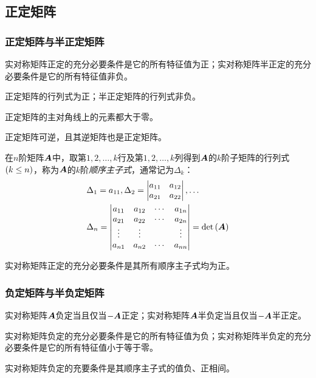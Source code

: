 \documentclass{ctexart}
\begin{document}
\subsection{正定矩阵}

\subsubsection*{正定矩阵与半正定矩阵}

\begin{theorem}
    实对称矩阵正定的充分必要条件是它的所有特征值为正；实对称矩阵半正定的充分必要条件是它的所有特征值非负。
\end{theorem}

\begin{property}
    正定矩阵的行列式为正；半正定矩阵的行列式非负。
\end{property}

\begin{property}
    正定矩阵的主对角线上的元素都大于零。
\end{property}

\begin{property}
    正定矩阵可逆，且其逆矩阵也是正定矩阵。
\end{property}

\begin{definition}[顺序主子式]
    在\(n\)阶矩阵\(\mata\)中，取第\(1,2,\dots,k\)行及第\(1,2,\dots,k\)列得到\(\mata\)的\(k\)阶子矩阵的行列式\(\mypar{k\le n}\)，称为\(\mata\)的\(k\)阶\emph{顺序主子式}，通常记为\(\Delta_k\)：
    \begin{align*}
         & \Delta_1=a_{11},\Delta_2=\begin{vmatrix}
                                        a_{11} & a_{12} \\a_{21}&a_{22}
                                    \end{vmatrix},\dots \\
         & \Delta_n=\sqmat{vmatrix}{a}{n}=\det{\mata}
    \end{align*}
\end{definition}

\begin{theorem}
    实对称矩阵正定的充分必要条件是其所有顺序主子式均为正。
\end{theorem}

\subsubsection*{负定矩阵与半负定矩阵}

\begin{theorem}
    实对称矩阵\(\mata\)负定当且仅当\(-\mata\)正定；实对称矩阵\(\mata\)半负定当且仅当\(-\mata\)半正定。
\end{theorem}

\begin{theorem}
    实对称矩阵负定的充分必要条件是它的所有特征值为负；实对称矩阵半负定的充分必要条件是它的所有特征值小于等于零。
\end{theorem}

\begin{theorem}
    实对称矩阵负定的充要条件是其顺序主子式的值负、正相间。
\end{theorem}
\end{document}

